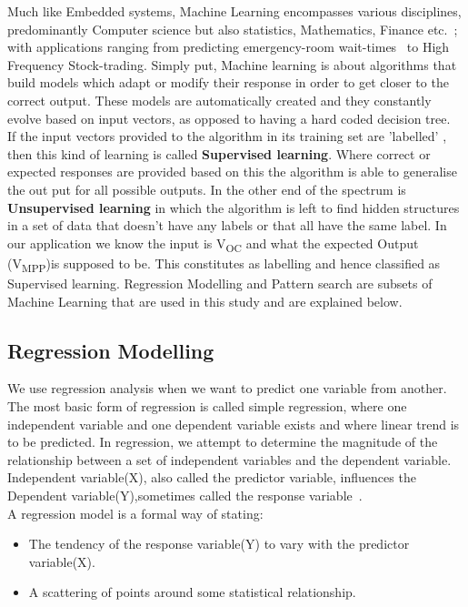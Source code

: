 {Much like Embedded systems, Machine Learning encompasses various disciplines, predominantly Computer science but also statistics, Mathematics, Finance etc.~\cite{marsland2011machine}; with applications ranging from predicting emergency-room wait-times~\cite{connelly2004discrete} to High Frequency Stock-trading. Simply put, Machine learning is about algorithms that build models which adapt or modify their response in order to get closer to the correct output. These models are automatically created and they constantly evolve based on input vectors, as opposed to having a hard coded decision tree.\\

If the input vectors provided to the algorithm in its training set are 'labelled' , then this kind of learning is called \textbf{Supervised learning}. Where correct or expected responses are provided based on this the algorithm is able to generalise the out put for all possible outputs. In the other end of the spectrum is \textbf{Unsupervised learning} in which the algorithm is left to find hidden structures in a set of data that doesn't have any labels or that all have the same label. In our application we know the input is V\textsubscript{OC} and what the expected Output (V\textsubscript{MPP})is supposed to be. This constitutes as  labelling and hence classified as Supervised learning. Regression Modelling and Pattern search are subsets of Machine Learning that are used in this study and are explained below.  
 
\subsection{Regression Modelling }

We use regression analysis when we want to predict one variable from another. The most basic form of regression is called simple regression, where one independent variable and one dependent variable exists and where linear trend is to be predicted. In regression, we attempt to determine the magnitude of the relationship between a set of independent variables and the dependent variable. Independent variable(X), also called the predictor variable, influences the Dependent variable(Y),sometimes called the response variable~\cite{lenarreg2006}.\\

A regression model is a formal way of stating:
\begin{itemize}
\item The tendency of the response variable(Y) to vary with the predictor variable(X).
\item A scattering of points around some statistical relationship.
\end {itemize}

}
